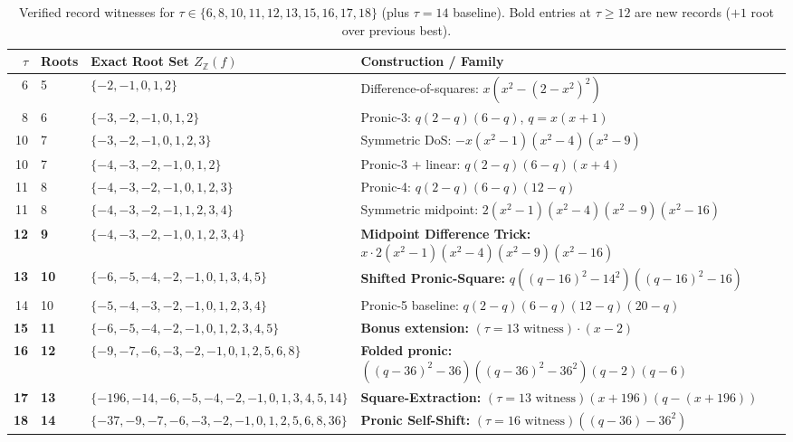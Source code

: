 \documentclass[11pt]{article}
\newcommand{\Z}{\mathbb{Z}}
\begin{document}
\begin{table}[ht]
\centering
\small
\caption{Verified record witnesses for $\tau \in \{6, 8, 10, 11, 12, 13, 15, 16, 17, 18\}$ (plus $\tau = 14$ baseline). Bold entries at $\tau \ge 12$ are new records ($+1$ root over previous best).}
\label{tab:witnesses}
\begin{tabular}{@{}rlll@{}}
\toprule
$\tau$ & Roots & Exact Root Set $Z_{\Z}(f)$ & Construction / Family \\
\midrule
6 & 5 & $\{-2,-1,0,1,2\}$ & Difference-of-squares: $x(x^2-(2-x^2)^2)$ \\
8 & 6 & $\{-3,-2,-1,0,1,2\}$ & Pronic-3: $q(2-q)(6-q)$, $q=x(x+1)$ \\
10 & 7 & $\{-3,-2,-1,0,1,2,3\}$ & Symmetric DoS: $-x(x^2-1)(x^2-4)(x^2-9)$ \\
10 & 7 & $\{-4,-3,-2,-1,0,1,2\}$ & Pronic-3 + linear: $q(2-q)(6-q)(x+4)$ \\
11 & 8 & $\{-4,-3,-2,-1,0,1,2,3\}$ & Pronic-4: $q(2-q)(6-q)(12-q)$ \\
11 & 8 & $\{-4,-3,-2,-1,1,2,3,4\}$ & Symmetric midpoint: $2(x^2-1)(x^2-4)(x^2-9)(x^2-16)$ \\
\textbf{12} & \textbf{9} & $\{-4,-3,-2,-1,0,1,2,3,4\}$ & \textbf{Midpoint Difference Trick:} $x \cdot 2(x^2-1)(x^2-4)(x^2-9)(x^2-16)$ \\
\textbf{13} & \textbf{10} & $\{-6,-5,-4,-2,-1,0,1,3,4,5\}$ & \textbf{Shifted Pronic-Square:} $q((q-16)^2-14^2)((q-16)^2-16)$ \\
14 & 10 & $\{-5,-4,-3,-2,-1,0,1,2,3,4\}$ & Pronic-5 baseline: $q(2-q)(6-q)(12-q)(20-q)$ \\
\textbf{15} & \textbf{11} & $\{-6,-5,-4,-2,-1,0,1,2,3,4,5\}$ & \textbf{Bonus extension:} $(\tau=13\text{ witness}) \cdot (x - 2)$ \\
\textbf{16} & \textbf{12} & $\{-9,-7,-6,-3,-2,-1,0,1,2,5,6,8\}$ & \textbf{Folded pronic:} $((q-36)^2-36)((q-36)^2-36^2)(q-2)(q-6)$ \\
\textbf{17} & \textbf{13} & $\{-196,-14,-6,-5,-4,-2,-1,0,1,3,4,5,14\}$ & \textbf{Square-Extraction:} $(\tau=13\text{ witness})(x+196)(q-(x+196))$ \\
\textbf{18} & \textbf{14} & $\{-37,-9,-7,-6,-3,-2,-1,0,1,2,5,6,8,36\}$ & \textbf{Pronic Self-Shift:} $(\tau=16\text{ witness})((q-36)-36^2)$ \\
\bottomrule
\end{tabular}
\end{table}
\end{document}
